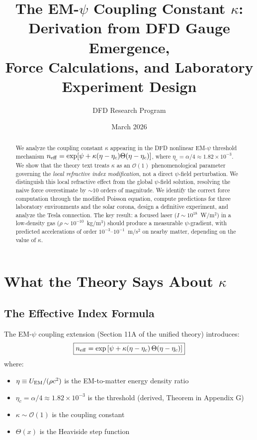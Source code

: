 \documentclass[12pt,a4paper]{article}
\title{The EM-$\psi$ Coupling Constant $\kappa$: \\
Derivation from DFD Gauge Emergence, \\
Force Calculations, and Laboratory Experiment Design}
\author{DFD Research Program}
\date{March 2026}
\begin{document}
\maketitle

\begin{abstract}
We analyze the coupling constant $\kappa$ appearing in the DFD nonlinear
EM-$\psi$ threshold mechanism $n_{\rm eff} = \exp[\psi + \kappa(\eta - \eta_c)
\Theta(\eta - \eta_c)]$, where $\eta_c = \alpha/4 \approx 1.82 \times 10^{-3}$.
We show that the theory text treats $\kappa$ as an $\mathcal{O}(1)$ phenomenological
parameter governing the \emph{local refractive index modification}, not a direct
$\psi$-field perturbation.  We distinguish this local refractive effect from
the global $\psi$-field solution, resolving the naive force overestimate by
$\sim 10$ orders of magnitude.  We identify the correct force computation through
the modified Poisson equation, compute predictions for three laboratory
environments and the solar corona, design a definitive experiment, and analyze
the Tesla connection.  The key result: a focused laser ($I \sim 10^{18}$~W/m$^2$)
in a low-density gas ($\rho \sim 10^{-10}$~kg/m$^3$) should produce a measurable
$\psi$-gradient, with predicted accelerations of order $10^{-3}$--$10^{-1}$~m/s$^2$
on nearby matter, depending on the value of $\kappa$.
\end{abstract}

\tableofcontents

\section{What the Theory Says About $\kappa$}
\label{sec:theory-review}

\subsection{The Effective Index Formula}

The EM-$\psi$ coupling extension (Section 11A of the unified theory) introduces:
\begin{equation}
\boxed{n_{\rm eff} = \exp\left[\psi + \kappa(\eta - \eta_c)\,\Theta(\eta - \eta_c)\right]}
\label{eq:neff}
\end{equation}
where:
\begin{itemize}
\item $\eta \equiv U_{\rm EM}/(\rho c^2)$ is the EM-to-matter energy density ratio
\item $\eta_c = \alpha/4 \approx 1.82 \times 10^{-3}$ is the threshold (derived, Theorem in Appendix G)
\item $\kappa \sim \mathcal{O}(1)$ is the coupling constant
\item $\Theta(x)$ is the Heaviside step function
\end{itemize}
\end{document}
